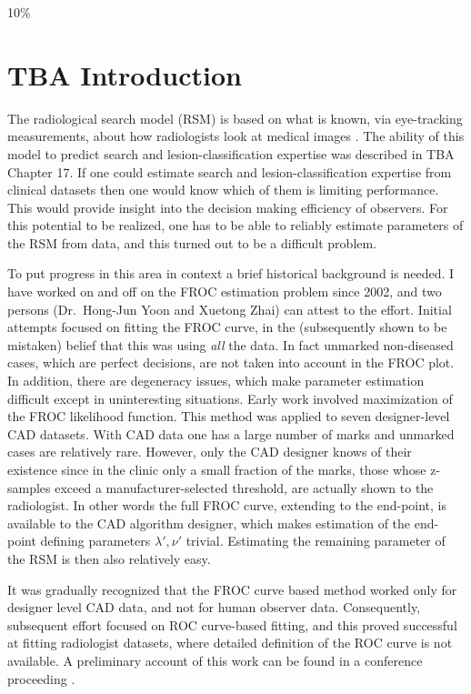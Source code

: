 \documentclass[
]{book}
\begin{document}
10\%

\hypertarget{rsm-fitting-intro}{%
\section{TBA Introduction}\label{rsm-fitting-intro}}

The radiological search model (RSM) is based on what is known, via eye-tracking measurements, about how radiologists look at medical images \citep{kundel2004modeling}. The ability of this model to predict search and lesion-classification expertise was described in TBA Chapter 17. If one could estimate search and lesion-classification expertise from clinical datasets then one would know which of them is limiting performance. This would provide insight into the decision making efficiency of observers. For this potential to be realized, one has to be able to reliably estimate parameters of the RSM from data, and this turned out to be a difficult problem.

To put progress in this area in context a brief historical background is needed. I have worked on and off on the FROC estimation problem since 2002, and two persons (Dr.~Hong-Jun Yoon and Xuetong Zhai) can attest to the effort. Initial attempts focused on fitting the FROC curve, in the (subsequently shown to be mistaken) belief that this was using \emph{all} the data. In fact unmarked non-diseased cases, which are perfect decisions, are not taken into account in the FROC plot. In addition, there are degeneracy issues, which make parameter estimation difficult except in uninteresting situations. Early work involved maximization of the FROC likelihood function. This method was applied to seven designer-level CAD datasets. With CAD data one has a large number of marks and unmarked cases are relatively rare. However, only the CAD designer knows of their existence since in the clinic only a small fraction of the marks, those whose z-samples exceed a manufacturer-selected threshold, are actually shown to the radiologist. In other words the full FROC curve, extending to the end-point, is available to the CAD algorithm designer, which makes estimation of the end-point defining parameters \(\lambda', \nu'\) trivial. Estimating the remaining parameter of the RSM is then also relatively easy.

It was gradually recognized that the FROC curve based method worked only for designer level CAD data, and not for human observer data. Consequently, subsequent effort focused on ROC curve-based fitting, and this proved successful at fitting radiologist datasets, where detailed definition of the ROC curve is not available. A preliminary account of this work can be found in a conference proceeding \citep{RN2125}.
\end{document}
